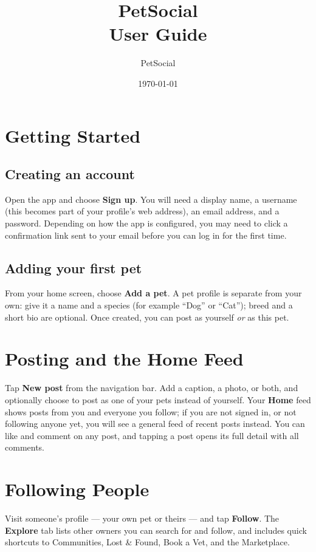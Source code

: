 \documentclass[11pt,a4paper]{article}
\title{PetSocial\\\large User Guide}
\author{PetSocial}
\date{\today}
\begin{document}
\maketitle
\thispagestyle{fancy}
\tableofcontents

\section{Getting Started}

\subsection{Creating an account}
Open the app and choose \textbf{Sign up}. You will need a display name, a username
(this becomes part of your profile's web address), an email address, and a password.
Depending on how the app is configured, you may need to click a confirmation link sent
to your email before you can log in for the first time.

\subsection{Adding your first pet}
From your home screen, choose \textbf{Add a pet}. A pet profile is separate from your
own: give it a name and a species (for example ``Dog'' or ``Cat''); breed and a short
bio are optional. Once created, you can post as yourself \emph{or} as this pet.

\section{Posting and the Home Feed}
Tap \textbf{New post} from the navigation bar. Add a caption, a photo, or both, and
optionally choose to post as one of your pets instead of yourself. Your \textbf{Home}
feed shows posts from you and everyone you follow; if you are not signed in, or not
following anyone yet, you will see a general feed of recent posts instead. You can like
and comment on any post, and tapping a post opens its full detail with all comments.

\section{Following People}
Visit someone's profile --- your own pet or theirs --- and tap \textbf{Follow}. The
\textbf{Explore} tab lists other owners you can search for and follow, and includes
quick shortcuts to Communities, Lost \& Found, Book a Vet, and the Marketplace.
\end{document}

